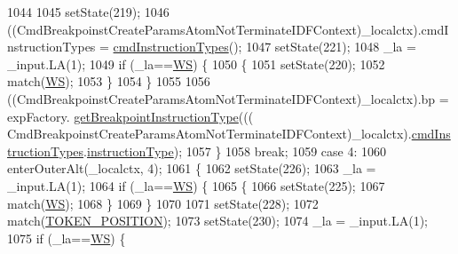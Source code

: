 \begin{DoxyCode}
1044 
1045         setState(219);
1046         ((CmdBreakpoinstCreateParamsAtomNotTerminateIDFContext)\_localctx).cmdInstructionTypes = 
      \hyperlink{classgov_1_1nasa_1_1jpf_1_1inspector_1_1server_1_1expression_1_1parser_1_1_expression_grammar_parser_a12e3659aace4eacebed317642d151170}{cmdInstructionTypes}();
1047         setState(221);
1048         \_la = \_input.LA(1);
1049         \textcolor{keywordflow}{if} (\_la==\hyperlink{classgov_1_1nasa_1_1jpf_1_1inspector_1_1server_1_1expression_1_1parser_1_1_expression_grammar_parser_ace44714ae633c7b14794cc5a24d9ebf3}{WS}) \{
1050           \{
1051           setState(220);
1052           match(\hyperlink{classgov_1_1nasa_1_1jpf_1_1inspector_1_1server_1_1expression_1_1parser_1_1_expression_grammar_parser_ace44714ae633c7b14794cc5a24d9ebf3}{WS});
1053           \}
1054         \}
1055 
1056          ((CmdBreakpoinstCreateParamsAtomNotTerminateIDFContext)\_localctx).bp =  expFactory.
      \hyperlink{classgov_1_1nasa_1_1jpf_1_1inspector_1_1server_1_1expression_1_1_expression_factory_a12400a7b6d1e60800ef65c13846ad473}{getBreakpointInstructionType}(((
      CmdBreakpoinstCreateParamsAtomNotTerminateIDFContext)\_localctx).\hyperlink{classgov_1_1nasa_1_1jpf_1_1inspector_1_1server_1_1expression_1_1parser_1_1_expression_grammar_parser_a12e3659aace4eacebed317642d151170}{cmdInstructionTypes}.\hyperlink{classgov_1_1nasa_1_1jpf_1_1inspector_1_1server_1_1expression_1_1parser_1_1_expression_grammar_pab3186941420d0c466c6d856eeff6b665_a5c492cf329994a1aac620e84cf15390f}{instructionType}); 
1057         \}
1058         \textcolor{keywordflow}{break};
1059       \textcolor{keywordflow}{case} 4:
1060         enterOuterAlt(\_localctx, 4);
1061         \{
1062         setState(226);
1063         \_la = \_input.LA(1);
1064         \textcolor{keywordflow}{if} (\_la==\hyperlink{classgov_1_1nasa_1_1jpf_1_1inspector_1_1server_1_1expression_1_1parser_1_1_expression_grammar_parser_ace44714ae633c7b14794cc5a24d9ebf3}{WS}) \{
1065           \{
1066           setState(225);
1067           match(\hyperlink{classgov_1_1nasa_1_1jpf_1_1inspector_1_1server_1_1expression_1_1parser_1_1_expression_grammar_parser_ace44714ae633c7b14794cc5a24d9ebf3}{WS});
1068           \}
1069         \}
1070 
1071         setState(228);
1072         match(\hyperlink{classgov_1_1nasa_1_1jpf_1_1inspector_1_1server_1_1expression_1_1parser_1_1_expression_grammar_parser_a92690007c873c501ce11d3a6b3f00265}{TOKEN\_POSITION});
1073         setState(230);
1074         \_la = \_input.LA(1);
1075         \textcolor{keywordflow}{if} (\_la==\hyperlink{classgov_1_1nasa_1_1jpf_1_1inspector_1_1server_1_1expression_1_1parser_1_1_expression_grammar_parser_ace44714ae633c7b14794cc5a24d9ebf3}{WS}) \{

\end{DoxyCode}
